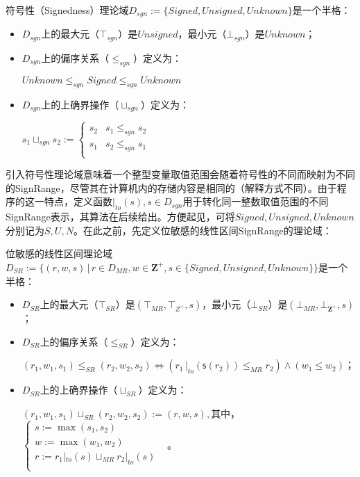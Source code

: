 \begin{definition}
	符号性（Signedness）理论域$ D_{sgn} := \{Signed, Unsigned, Unknown\} $是一个半格：
	\begin{itemize}
		\item $ D_{sgn} $上的最大元（$ \top_{sgn} $）是$ Unsigned $，最小元（$ \bot_{sgn} $）是$ Unknown $；
		
		\item $ D_{sgn} $上的偏序关系（$ \le_{sgn} $）定义为：\\
			\centerline{$ Unknown \le_{sgn} Signed \le_{sgn} Unknown $}
			
		\item $ D_{sgn} $上的上确界操作（$ \sqcup_{sgn} $）定义为：\\
			\centerline{$ s_1 \sqcup_{sgn} s_2 := \begin{cases}
				s_2 & s_1 \le_{sgn} s_2\\
				s_1 & s_2 \le_{sgn} s_1\\
				\end{cases} $}
	\end{itemize}
\end{definition}

引入符号性理论域意味着一个整型变量取值范围会随着符号性的不同而映射为不同的SignRange，尽管其在计算机内的存储内容是相同的（解释方式不同）。由于程序的这一特点，定义函数$ |_{to}(s), s \in D_{sgn} $用于转化同一整数取值范围的不同SignRange表示，其算法在后续给出。方便起见，可将$ Signed, Unsigned, Unknown $分别记为$ S, U, N $。在此之前，先定义位敏感的线性区间SignRange的理论域：

\begin{definition}
	位敏感的线性区间理论域	$ D_{SR} := \{(r, w,  s) \, | \,  r \in D_{MR}, w \in \mathbf{Z^+}, s \in \{Signed, Unsigned, Unknown\}\} $是一个半格：
	\begin{itemize}
		\item $ D_{SR} $上的最大元（$ \top_{SR} $）是$ (\top_{MR}, \top_{Z^+}, s) $，最小元（$ \bot_{SR} $）是$ (\bot_{MR}, \bot_{\mathbf{Z}^+}, s)$；
		
		\item $ D_{SR} $上的偏序关系（$ \le_{SR} $）定义为：\\
			\centerline{$ (r_1, w_1, s_1) \le_{SR} (r_2, w_2, s_2) \iff (r_1 \,  |_{to}(\mathsf{s}(r_2)) \le_{MR} r_2) \land (w_1 \le w_2) $；}
			
		\item $ D_{SR} $上的上确界操作（$ \sqcup_{SR} $）定义为：\\
			\centerline{$ (r_1, w_1, s_1) \sqcup_{SR} (r_2, w_2, s_2)  :=  (r, w, s) , $其中，$ \begin{cases}
				s := \max(s_1, s_2)&\\
				w := \max(w_1, w_2)&\\
				r := r_1 |_{to}(s) \sqcup_{MR} r_2 |_{to}(s)&\\
				\end{cases}$。}
	\end{itemize}
\end{definition}

